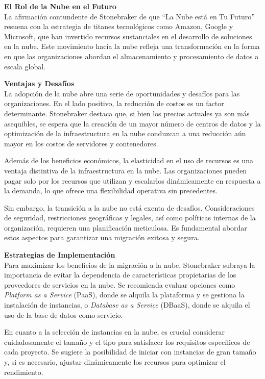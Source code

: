 \documentclass[11pt]{report}
\begin{document}
\textbf{El Rol de la Nube en el Futuro} \\
La afirmación contundente de Stonebraker de que “La Nube está en Tu Futuro” resuena con la estrategia de titanes tecnológicos como Amazon, Google y Microsoft, 
que han invertido recursos sustanciales en el desarrollo de soluciones en la nube. Este movimiento hacia la nube refleja una transformación en la forma en que
las organizaciones abordan el almacenamiento y procesamiento de datos a escala global.

\textbf{Ventajas y Desafíos} \\
La adopción de la nube abre una serie de oportunidades y desafíos para las organizaciones. En el lado positivo, la reducción de costos es un factor determinante. 
Stonebraker destaca que, si bien los precios actuales ya son más asequibles, se espera que la creación de un mayor número de centros de datos y la optimización de
la infraestructura en la nube conduzcan a una reducción aún mayor en los costos de servidores y contenedores.

Además de los beneficios económicos, la elasticidad en el uso de recursos es una ventaja distintiva de la infraestructura en la nube. Las organizaciones pueden
pagar solo por los recursos que utilizan y escalarlos dinámicamente en respuesta a la demanda, lo que ofrece una flexibilidad operativa sin precedentes.

Sin embargo, la transición a la nube no está exenta de desafíos. Consideraciones de seguridad, restricciones geográficas y legales, así como políticas internas de
la organización, requieren una planificación meticulosa. Es fundamental abordar estos aspectos para garantizar una migración exitosa y segura.

\textbf{Estrategias de Implementación} \\
Para maximizar los beneficios de la migración a la nube, Stonebraker subraya la importancia de evitar la dependencia de características propietarias de los proveedores
de servicios en la nube. Se recomienda evaluar opciones como \emph{Platform as a Service} (PaaS), donde se alquila la plataforma y se gestiona la instalación de instancias, o
\emph{Database as a Service} (DBaaS), donde se alquila el uso de la base de datos como servicio.

En cuanto a la selección de instancias en la nube, es crucial considerar cuidadosamente el tamaño y el tipo para satisfacer los requisitos específicos de cada proyecto. Se sugiere 
la posibilidad de iniciar con instancias de gran tamaño y, si es necesario, ajustar dinámicamente los recursos para optimizar el rendimiento.
\end{document}
